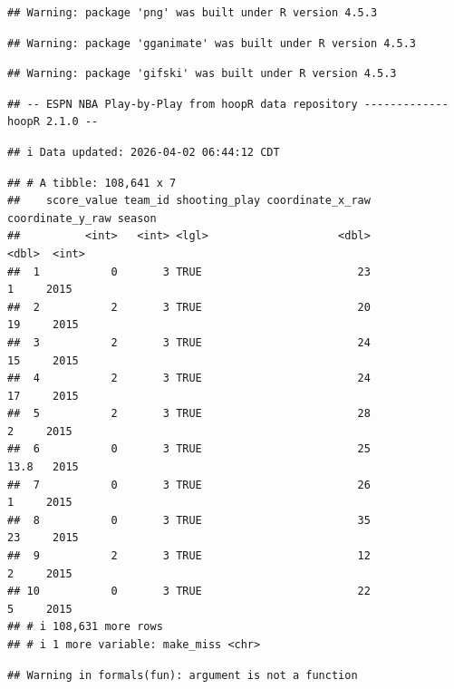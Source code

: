 \documentclass[
]{article}
\begin{document}
\begin{verbatim}
## Warning: package 'png' was built under R version 4.5.3
\end{verbatim}

\begin{verbatim}
## Warning: package 'gganimate' was built under R version 4.5.3
\end{verbatim}

\begin{verbatim}
## Warning: package 'gifski' was built under R version 4.5.3
\end{verbatim}

\begin{verbatim}
## -- ESPN NBA Play-by-Play from hoopR data repository ------------- hoopR 2.1.0 --
\end{verbatim}

\begin{verbatim}
## i Data updated: 2026-04-02 06:44:12 CDT
\end{verbatim}

\begin{verbatim}
## # A tibble: 108,641 x 7
##    score_value team_id shooting_play coordinate_x_raw coordinate_y_raw season
##          <int>   <int> <lgl>                    <dbl>            <dbl>  <int>
##  1           0       3 TRUE                        23              1     2015
##  2           2       3 TRUE                        20             19     2015
##  3           2       3 TRUE                        24             15     2015
##  4           2       3 TRUE                        24             17     2015
##  5           2       3 TRUE                        28              2     2015
##  6           0       3 TRUE                        25             13.8   2015
##  7           0       3 TRUE                        26              1     2015
##  8           0       3 TRUE                        35             23     2015
##  9           2       3 TRUE                        12              2     2015
## 10           0       3 TRUE                        22              5     2015
## # i 108,631 more rows
## # i 1 more variable: make_miss <chr>
\end{verbatim}

\begin{verbatim}
## Warning in formals(fun): argument is not a function
\end{verbatim}
\end{document}
